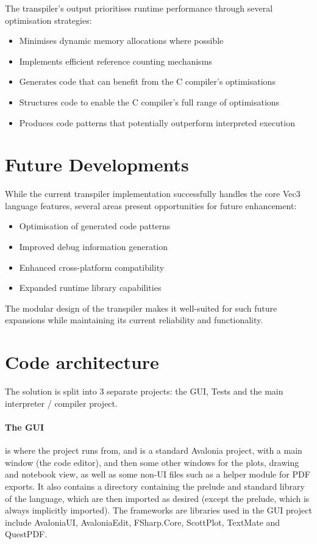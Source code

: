 The transpiler's output prioritises runtime performance through several optimisation strategies:

\begin{itemize}[nolistsep]
\item Minimises dynamic memory allocations where possible
\item Implements efficient reference counting mechanisms
\item Generates code that can benefit from the C compiler's optimisations
\item Structures code to enable the C compiler's full range of optimisations
\item Produces code patterns that potentially outperform interpreted execution
\end{itemize}

\section{Future Developments}\label{sec:future-developments}
While the current transpiler implementation successfully handles the core Vec3 language features, several areas present opportunities for future enhancement:

\begin{itemize}[nolistsep]
\item Optimisation of generated code patterns
\item Improved debug information generation
\item Enhanced cross-platform compatibility
\item Expanded runtime library capabilities
\end{itemize}

The modular design of the transpiler makes it well-suited for such future expansions while maintaining its current reliability and functionality.

\section{Code architecture}\label{sec:code-architecture}
The solution is split into 3 separate projects: the GUI, Tests and the main interpreter / compiler project.

\paragraph{The GUI} is where the project runs from, and is a standard Avalonia project, with a main window (the code editor), 
and then some other windows for the plots, drawing and notebook view, as well as some non-UI files such as a helper 
module for PDF exports.
It also contains a directory containing the prelude and standard library of the language, which are then imported as 
desired (except the prelude, which is always implicitly imported).
The frameworks are libraries used in the GUI project include AvaloniaUI, AvaloniaEdit, FSharp.Core, ScottPlot, 
TextMate and QuestPDF\@. 

